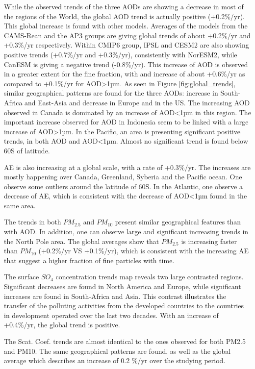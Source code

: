 \documentclass[journal abbreviation, manuscript]{copernicus}
\begin{document}
While the observed trends of the three AODs are showing a decrease in most of the regions of the World, the global AOD trend is actually positive (+0.2\%/yr). This global increase is found with other models. Averages of the models from the CAMS-Rean and the AP3 groups are giving global trends of about +0.2\%/yr and +0.3\%/yr respectively. Within CMIP6 group, IPSL and CESM2 are also showing positive trends (+0.7\%/yr and +0.3\%/yr), consistently with NorESM2, while CanESM is giving a negative trend (-0.8\%/yr).
This increase of AOD is observed in a greater extent for the fine fraction, with and increase of about +0.6\%/yr as compared to +0.1\%/yr for AOD>1µm. As seen in Figure \ref{fig:global_trends}, similar geographical patterns are found for the three AODs: increase in South-Africa and East-Asia and decrease in Europe and in the US. The increasing AOD observed in Canada is dominated by an increase of AOD<1µm in this region. The important increase observed for AOD in Indonesia seem to be linked with a large increase of AOD>1µm. In the Pacific, an area is presenting significant positive trends, in both AOD and AOD<1µm. Almost no significant trend is found below 60\textdegree S of latitude.

AE is also increasing  at a global scale, with a rate of +0.3\%/yr. The increases are mostly happening over Canada, Greenland, Syberia and the Pacific ocean. One observe some outliers around the latitude of 60\textdegree S. In the Atlantic, one observe a decrease of AE, which is consistent with the decrease of AOD<1µm found in the same area.

The trends in both $PM_{2.5}$ and $PM_{10}$ present similar geographical features than with AOD. In addition, one can observe large and significant increasing trends in the North Pole area. The global averages show that $PM_{2.5}$ is increasing faster than $PM_{10}$  (+0.2\%/yr VS +0.1\%/yr), which is consistent with the increasing AE that suggest a higher fraction of fine particles with time.

The surface $SO_{4}$ concentration trends map reveals two large contrasted regions. Significant decreases are found in North America and Europe, while significant increases are found in South-Africa and Asia. This contrast illustrates the transfer of the polluting activities from the developed countries to the countries in development operated over the last two decades. With an increase of +0.4\%/yr, the global trend is positive.

The Scat. Coef. trends are almost identical to the ones observed for both PM2.5 and PM10. The same geographical patterns are found, as well as the global average which describes an increase of 0.2 \%/yr over the studying period.
\end{document}
